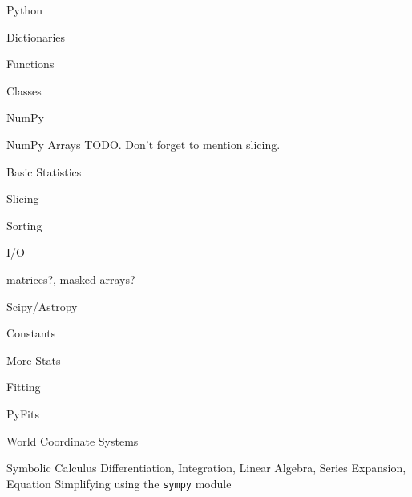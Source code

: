 \documentclass{beamer}
\begin{document}
\begin{frame}{Python}
  \begin{block}{Dictionaries}
  
  \end{block}
  \begin{block}{Functions}

  \end{block}
  \begin{block}{Classes}

  \end{block}
\end{frame}

\begin{frame}{NumPy}
  \begin{block}{NumPy Arrays}
  TODO. Don't forget to mention slicing.
  \end{block}
  \begin{block}{Basic Statistics}
  \end{block}
  \begin{block}{Slicing}

  \end{block}
  \begin{block}{Sorting}

  \end{block}    
  \begin{block}{I/O}

  \end{block}     
  matrices?, masked arrays?
\end{frame}

\begin{frame}{Scipy/Astropy}
  \begin{block}{Constants}

  \end{block}
  \begin{block}{More Stats}

  \end{block}
  \begin{block}{Fitting}

  \end{block}  
  \begin{block}{PyFits}

  \end{block}  
  \begin{block}{World Coordinate Systems}

  \end{block}
  \begin{block}{Symbolic Calculus}
    Differentiation, Integration, Linear Algebra, Series Expansion, Equation Simplifying using the \texttt{sympy} module
  \end{block}
\end{frame}
\end{document}
